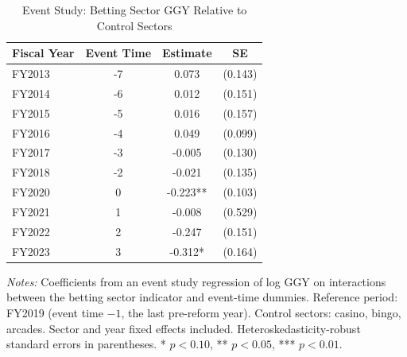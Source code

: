 \begin{table}[H]
\centering
\caption{Event Study: Betting Sector GGY Relative to Control Sectors}
\begin{threeparttable}
\begin{tabular}{lccc}
\toprule
Fiscal Year & Event Time & Estimate & SE \\
\midrule
FY2013 & -7 & 0.073 & (0.143) \\
FY2014 & -6 & 0.012 & (0.151) \\
FY2015 & -5 & 0.016 & (0.157) \\
FY2016 & -4 & 0.049 & (0.099) \\
FY2017 & -3 & -0.005 & (0.130) \\
FY2018 & -2 & -0.021 & (0.135) \\
FY2020 & 0 & -0.223** & (0.103) \\
FY2021 & 1 & -0.008 & (0.529) \\
FY2022 & 2 & -0.247 & (0.151) \\
FY2023 & 3 & -0.312* & (0.164) \\
\bottomrule
\end{tabular}
\begin{tablenotes}[flushleft]
\small
\item \textit{Notes:} Coefficients from an event study regression of log GGY on interactions between the betting sector indicator and event-time dummies. Reference period: FY2019 (event time $-1$, the last pre-reform year). Control sectors: casino, bingo, arcades. Sector and year fixed effects included. Heteroskedasticity-robust standard errors in parentheses. * $p<0.10$, ** $p<0.05$, *** $p<0.01$.
\end{tablenotes}
\end{threeparttable}
\label{tab:eventstudy}
\end{table}

